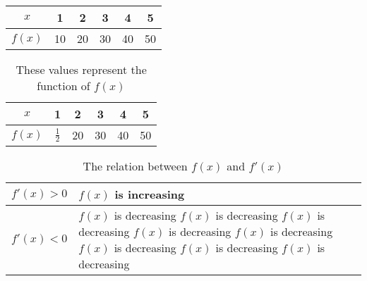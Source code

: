 \documentclass[11pt]{article}
\begin{document}
	
	\begin{tabular}{|c|c|c|c|c|c|}
		\hline
		$x$ & 1 & 2 & 3 & 4 & 5 \\ \hline
		$f(x)$ & 10 & 20 & 30 & 40 & 50 \\ \hline
	\end{tabular}
	
	\vspace{1cm}
	
	\begin{table}[H]
	
		\def \arraystretch{1.5}
		\centering
	
		\begin{tabular}{|c|c|c|c|c|c|}
			\hline
			$x$ & 1 & 2 & 3 & 4 & 5 \\ \hline
			$f(x)$ & $\frac{1}{2}$ & 20 & 30 & 40 & 50 	\\ \hline
		\end{tabular}
		
		\caption{These values represent the function of $f(x)$}
	
	\end{table}
	
	\begin{table}[H]
	
		\def \arraystretch{1.5}
		\centering
		\caption{The relation between $f(x)$ and $f'(x)$}
	
		\begin{tabular}{|l|p{10cm}|}
			\hline
			$f'(x) > 0$ & $f(x)$ is increasing \\ \hline
			$f'(x) < 0$ & $f(x)$ is decreasing $f(x)$ is decreasing $f(x)$ is decreasing $f(x)$ is decreasing $f(x)$ is decreasing $f(x)$ is decreasing $f(x)$ is decreasing $f(x)$ is decreasing 	\\ \hline
		\end{tabular}
		
		
	
	\end{table}
	
\end{document}
